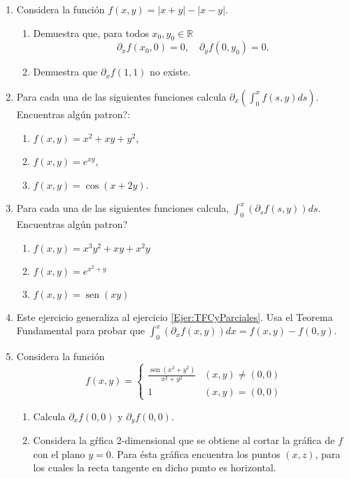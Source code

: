 \documentclass{article}
\theoremstyle{definition}
\newcommand{\sen}{\operatorname{sen}}
\begin{document}
\begin{enumerate}
       

     \item Considera la funci\'on $f(x,y)=|x+y|-|x-y|$.
       \begin{enumerate}
       \item Demuestra que, para todos $x_0,y_0\in \mathbb{R}$
         $$
         \partial_xf(x_0,0)=0, \quad \partial_yf(0,y_0)=0.
         $$
       \item Demuestra que $\partial_xf(1,1)$ no existe.
         
       \end{enumerate}


              
     \item Para cada una de las siguientes funciones calcula $\partial_x\left( \int_0^x f(s,y)ds \right)$. \textquestiondown Encuentras alg\'un patron?:
       \begin{enumerate}
       \item $f(x,y)=x^2+xy+y^2$,
       \item $f(x,y)=e^{xy}$,
       \item $f(x,y)=\cos(x+2y)$.
       \end{enumerate}
       
     \item\label{Ejer:TFCyParciales} Para cada una de las siguientes funciones calcula,  $\int_0^x(\partial_s f(s,y))ds$.
      \textquestiondown Encuentras alg\'un patron?

       \begin{enumerate}
       \item $f(x,y)=x^3y^2+xy+x^2y$
       \item $f(x,y)=e^{x^2+y}$
       \item $f(x,y)=\sen(xy)$
       \end{enumerate}

       
      
     \item Este ejercicio generaliza al ejercicio \ref{Ejer:TFCyParciales}. Usa el Teorema Fundamental para probar
       que $\int_0^x(\partial_x f(x,y))dx=f(x,y)-f(0,y)$.
      
       
       

   
     \item Considera la funci\'on
       $$
       f(x,y)=\left\{
         \begin{array}{cc}
           \frac{\sen(x^2+y^2)}{x^2+y^2} & (x,y)\ne (0,0) \\
           1 & (x,y)=(0,0)
         \end{array}
         \right.
         $$
         \begin{enumerate}
         \item Calcula $\partial_xf(0,0)$ y $\partial_yf(0,0)$.
         \item Considera la g\'rfica 2-dimensional que se obtiene al cortar
           la gr\'afica de $f$ con el plano $y=0$. Para \'esta gr\'afica encuentra
           los puntos $(x,z)$,  para los cuales la recta tangente en dicho punto es horizontal.
         \end{enumerate}    
   



\end{enumerate}
\end{document}
